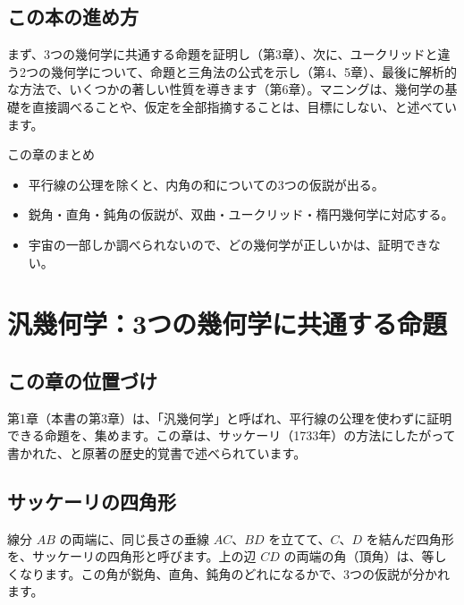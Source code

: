 \documentclass[a4paper,11pt,openany]{ltjsbook}
\begin{document}
\section{この本の進め方}

まず、3つの幾何学に共通する命題を証明し（第3章）、次に、ユークリッドと違う2つの幾何学について、命題と三角法の公式を示し（第4、5章）、最後に解析的な方法で、いくつかの著しい性質を導きます（第6章）。マニングは、幾何学の基礎を直接調べることや、仮定を全部指摘することは、目標にしない、と述べています。

\begin{pointbox}{この章のまとめ}
\begin{itemize}[leftmargin=*]
\item 平行線の公理を除くと、内角の和についての3つの仮説が出る。
\item 鋭角・直角・鈍角の仮説が、双曲・ユークリッド・楕円幾何学に対応する。
\item 宇宙の一部しか調べられないので、どの幾何学が正しいかは、証明できない。
\end{itemize}
\end{pointbox}

\chapter{汎幾何学：3つの幾何学に共通する命題}

\section{この章の位置づけ}

第1章（本書の第3章）は、「汎幾何学」と呼ばれ、平行線の公理を使わずに証明できる命題を、集めます。この章は、サッケーリ（1733年）の方法にしたがって書かれた、と原著の歴史的覚書で述べられています。

\section{サッケーリの四角形}

線分 $AB$ の両端に、同じ長さの垂線 $AC$、$BD$ を立てて、$C$、$D$ を結んだ四角形を、サッケーリの四角形と呼びます。上の辺 $CD$ の両端の角（頂角）は、等しくなります。この角が鋭角、直角、鈍角のどれになるかで、3つの仮説が分かれます。
\end{document}
